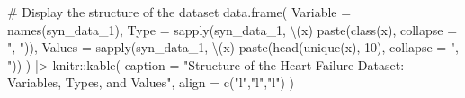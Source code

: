 \documentclass[
  letterpaper,
  DIV=11,
  numbers=noendperiod]{scrartcl}
\newenvironment{Shaded}{\begin{snugshade}}{\end{snugshade}}
\newcommand{\AttributeTok}[1]{\textcolor[rgb]{0.40,0.45,0.13}{#1}}
\newcommand{\CommentTok}[1]{\textcolor[rgb]{0.37,0.37,0.37}{#1}}
\newcommand{\DecValTok}[1]{\textcolor[rgb]{0.68,0.00,0.00}{#1}}
\newcommand{\FunctionTok}[1]{\textcolor[rgb]{0.28,0.35,0.67}{#1}}
\newcommand{\NormalTok}[1]{\textcolor[rgb]{0.00,0.23,0.31}{#1}}
\newcommand{\SpecialCharTok}[1]{\textcolor[rgb]{0.37,0.37,0.37}{#1}}
\newcommand{\StringTok}[1]{\textcolor[rgb]{0.13,0.47,0.30}{#1}}
\begin{document}
\begin{Shaded}
\begin{Highlighting}[]
\CommentTok{\# Display the structure of the dataset}
\FunctionTok{data.frame}\NormalTok{(}
  \AttributeTok{Variable =} \FunctionTok{names}\NormalTok{(syn\_data\_1),}
  \AttributeTok{Type =} \FunctionTok{sapply}\NormalTok{(syn\_data\_1, \textbackslash{}(x) }\FunctionTok{paste}\NormalTok{(}\FunctionTok{class}\NormalTok{(x), }\AttributeTok{collapse =} \StringTok{", "}\NormalTok{)),}
  \AttributeTok{Values =} \FunctionTok{sapply}\NormalTok{(syn\_data\_1, \textbackslash{}(x) }\FunctionTok{paste}\NormalTok{(}\FunctionTok{head}\NormalTok{(}\FunctionTok{unique}\NormalTok{(x), }\DecValTok{10}\NormalTok{), }\AttributeTok{collapse =} \StringTok{", "}\NormalTok{))}
\NormalTok{) }\SpecialCharTok{|\textgreater{}}
\NormalTok{  knitr}\SpecialCharTok{::}\FunctionTok{kable}\NormalTok{(}
    \AttributeTok{caption =} \StringTok{"Structure of the Heart Failure Dataset: Variables, Types, and Values"}\NormalTok{,}
    \AttributeTok{align =} \FunctionTok{c}\NormalTok{(}\StringTok{"l"}\NormalTok{,}\StringTok{"l"}\NormalTok{,}\StringTok{"l"}\NormalTok{)}
\NormalTok{  )}
\end{Highlighting}
\end{Shaded}
\end{document}
